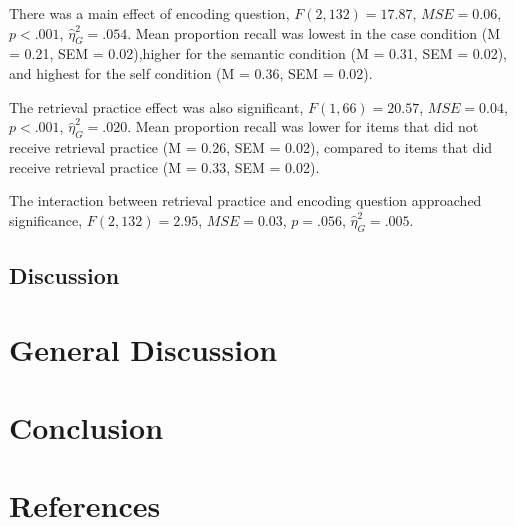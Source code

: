 \documentclass[
  man,floatsintext]{apa6}
\begin{document}
There was a main effect of encoding question, \(F(2, 132) = 17.87\), \(\mathit{MSE} = 0.06\), \(p < .001\), \(\hat{\eta}^2_G = .054\). Mean proportion recall was lowest in the case condition (M = 0.21, SEM = 0.02),higher for the semantic condition (M = 0.31, SEM = 0.02), and highest for the self condition (M = 0.36, SEM = 0.02).

The retrieval practice effect was also significant, \(F(1, 66) = 20.57\), \(\mathit{MSE} = 0.04\), \(p < .001\), \(\hat{\eta}^2_G = .020\). Mean proportion recall was lower for items that did not receive retrieval practice (M = 0.26, SEM = 0.02), compared to items that did receive retrieval practice (M = 0.33, SEM = 0.02).

The interaction between retrieval practice and encoding question approached significance, \(F(2, 132) = 2.95\), \(\mathit{MSE} = 0.03\), \(p = .056\), \(\hat{\eta}^2_G = .005\).

\hypertarget{discussion}{%
\subsection{Discussion}\label{discussion}}

\hypertarget{general-discussion}{%
\section{General Discussion}\label{general-discussion}}

\hypertarget{conclusion}{%
\section{Conclusion}\label{conclusion}}

\hypertarget{references}{%
\section{References}\label{references}}
\end{document}
